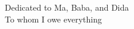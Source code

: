 \thispagestyle{empty}
{}

\vspace*{6cm}

\begin{center}
    Dedicated to Ma, Baba, and Dida\\
    To whom I owe everything
\end{center}

\medskip
